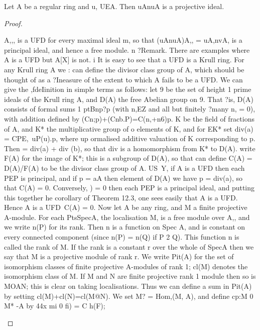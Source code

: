 \begin{theorem}[Theorem 20.6]\label{mcrt-auto-theorem-20-6}
\begin{mathematicalrecord}
Let A be a regular ring and u, UEA. Then uAnuA is a
projective ideal.
\end{mathematicalrecord}
\end{theorem}
\begin{proof}
\begin{mathematicalrecord}
A,,, is a UFD for every maximal ideal m, so that (uAnuA)A,, =
uA,nvA,     is a principal ideal, and hence a free module. n
?Remark.     There are examples where A is a UFD but A[X] is not.
     i It is easy to see that a UFD is a Krull ring. For any Krull ring A we
     : can define the divisor class group of A, which should be thought of as a
     ?Ineasure of the extent to which A fails to be a UFD. We can give the
     ,fdeIinition in simple terms as follows: let 9 be the set of height 1 prime
       ideals of the Krull ring A, and D(A) the free Abelian group on 9. That
     ?is, D(A) consists of formal sums 1 ptBnp?p (with n,EZ and all but finitely
     ?many n, = 0), with addition defined by
                (Cn;p)+(Cnb.P)=C(n,+n6)p.
          K be the field of fractions of A, and K* the multiplicative   group of
               o elements of K, and for EK* set div(a) = CPE,~uP(u).p, where up
                ormalised additive valuation of K corresponding to p. Then
               = div(a) + div (b), so that div is a homomorphism from K* to D(A).
          write F(A) for the image of K*; this is a subgroup of D(A), so that
          can define C(A) = D(A)/F(A) to be the divisor class group of A.
             US~Y, if A is a UFD then each PEP is principal, and if p = aA then
             element of D(A) we have p = div(a), so that C(A) = 0. Conversely,
            ) = 0 then each PEP is a principal ideal, and putting this together
           he corollary of Theorem 12.3, one sees easily that A is a UFD. Hence
                A is a UFD~C(A)       = 0.
Now let A be any ring, and M a finite projective A-module. For each
PtsSpecA, the localisation M, is a free module over A,, and we write
n(P) for its rank. Then n is a function on Spec A, and is constant on every
connected component (since n(P) = n(Q) if P 2 Q). This function n is called
the rank of M. If the rank is a constant r over the whole of SpecA then
we say that M is a projective module of rank r. We write Pit(A) for the
set of isomorphism    classes of finite projective A-modules of rank 1; cl(M)
denotes the isomorphism class of M. If M and N are finite projective rank
1 module then so is MOAN; this is clear on taking localisations. Thus
we can define a sum in Pit(A) by setting
       cl(M)+cl(N)=cl(M@N).
We set M? = Hom,(M,      A), and define cp:M 0 M* -A         by
         44x   mi   0   fi)   =   C   h(F);


\end{mathematicalrecord}
\end{proof}
